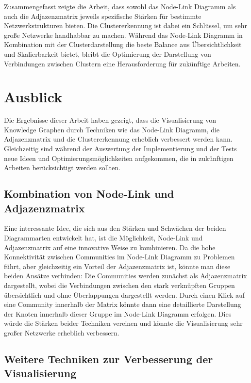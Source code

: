 Zusammengefasst zeigte die Arbeit, dass sowohl das Node-Link Diagramm als auch die Adjazenzmatrix jeweils spezifische Stärken für bestimmte Netzwerkstrukturen bieten. Die Clustererkennung ist dabei ein Schlüssel, um sehr große Netzwerke handhabbar zu machen. Während das Node-Link Diagramm in Kombination mit der Clusterdarstellung die beste Balance aus Übersichtlichkeit und Skalierbarkeit bietet, bleibt die Optimierung der Darstellung von Verbindungen zwischen Clustern eine Herausforderung für zukünftige Arbeiten.

\section{Ausblick}

Die Ergebnisse dieser Arbeit haben gezeigt, dass die Visualisierung von Knowledge Graphen durch Techniken wie das Node-Link Diagramm, die Adjazenzmatrix und die Clustererkennung erheblich verbessert werden kann. Gleichzeitig sind während der Auswertung der Implementierung und der Tests neue Ideen und Optimierungsmöglichkeiten aufgekommen, die in zukünftigen Arbeiten berücksichtigt werden sollten.

\subsection{Kombination von Node-Link und Adjazenzmatrix}

Eine interessante Idee, die sich aus den Stärken und Schwächen der beiden Diagrammarten entwickelt hat, ist die Möglichkeit, Node-Link und Adjazenzmatrix auf eine innovative Weise zu kombinieren. Da die hohe Konnektivität zwischen Communities im Node-Link Diagramm zu Problemen führt, aber gleichzeitig ein Vorteil der Adjazenzmatrix ist, könnte man diese beiden Ansätze verbinden: Die Communities werden zunächst als Adjazenzmatrix dargestellt, wobei die Verbindungen zwischen den stark verknüpften Gruppen übersichtlich und ohne Überlappungen dargestellt werden. Durch einen Klick auf eine Community innerhalb der Matrix könnte dann eine detaillierte Darstellung der Knoten innerhalb dieser Gruppe im Node-Link Diagramm erfolgen. Dies würde die Stärken beider Techniken vereinen und könnte die Visualisierung sehr großer Netzwerke erheblich verbessern.

\subsection{Weitere Techniken zur Verbesserung der Visualisierung}

